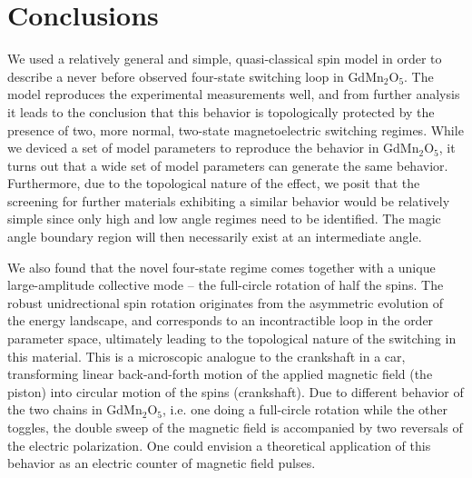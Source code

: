 \section{Conclusions}
We used a relatively general and simple, quasi-classical spin model in order to describe a never before observed four-state switching loop in GdMn$_2$O$_5$.
The model reproduces the experimental measurements well, and from further analysis it leads to the conclusion that this behavior is topologically protected by the presence of two, more normal, two-state magnetoelectric switching regimes.
While we deviced a set of model parameters to reproduce the behavior in GdMn$_2$O$_5$, it turns out that a wide set of model parameters can generate the same behavior.
Furthermore, due to the topological nature of the effect, we posit that the screening for further materials exhibiting a similar behavior would be relatively simple since only high and low angle regimes need to be identified.
The magic angle boundary region will then necessarily exist at an intermediate angle.

We also found that the novel four-state regime comes together with a unique large-amplitude collective mode -- the full-circle rotation of half the spins.
The robust unidrectional spin rotation originates from the asymmetric evolution of the energy landscape, and corresponds to an incontractible loop in the order parameter space, ultimately leading to the topological nature of the switching in this material.
This is a microscopic analogue to the crankshaft in a car, transforming linear back-and-forth motion of the applied magnetic field (the piston) into circular motion of the spins (crankshaft).
Due to different behavior of the two chains in GdMn$_2$O$_5$, i.e. one doing a full-circle rotation while the other toggles, the double sweep of the magnetic field is accompanied by two reversals of the electric polarization.
%
One could envision a theoretical application of this behavior as an electric counter of magnetic field pulses.
